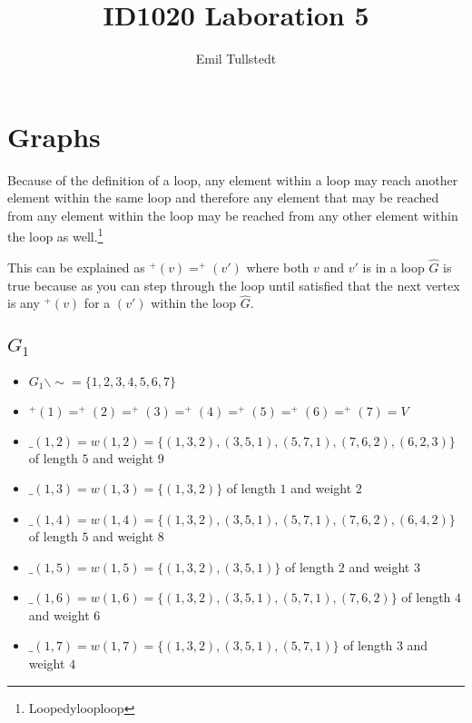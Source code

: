 \documentclass[a4paper,11pt,notitlepage]{article}
\title{ID1020 Laboration 5}
\author{Emil Tullstedt}
\begin{document}
\maketitle

\tableofcontents

\section{Graphs}

Because of the definition of a loop, any element within a loop may reach another element within the same loop and therefore any element that may be reached from any element within the loop may be reached from any other element within the loop as well.\footnote{Loopedylooploop}

This can be explained as $^+(v) = ^+(v')$ where both $v$ and $v'$ is in a loop $\hat{G}$ is true because as you can step through the loop until satisfied that the next vertex is any $^+(v)$ for a $(v')$ within the loop $\hat{G}$.

\newpage
\subsection{$G_1$}
\begin{itemize}
\item $G_1 \backslash\sim = \{1, 2, 3, 4, 5, 6, 7\}$
\item $^+(1) = ^+(2) = ^+(3) = ^+(4) = ^+(5) = ^+(6) = ^+(7) = V$
\item $\_(1, 2) = w(1, 2) = \{(1, 3, 2), (3, 5, 1), (5, 7, 1), (7, 6, 2), (6, 2, 3)\}$ of length $5$ and weight $9$
\item $\_(1, 3) = w(1, 3) = \{(1,3,2)\}$ of length $1$ and weight $2$
\item $\_(1, 4) = w(1, 4) = \{(1, 3, 2), (3, 5, 1), (5, 7, 1), (7, 6, 2), (6, 4, 2)\}$ of length $5$ and weight $8$
\item $\_(1, 5) = w(1, 5) = \{(1, 3, 2), (3, 5, 1)\}$ of length $2$ and weight $3$
\item $\_(1, 6) = w(1, 6) = \{(1, 3, 2), (3, 5, 1), (5, 7, 1), (7, 6, 2)\} $ of length $4$ and weight $6$
\item $\_(1, 7) = w(1, 7) = \{(1, 3, 2), (3, 5, 1), (5, 7, 1)\}$ of length $3$ and weight $4$
\end{itemize}
\end{document}
